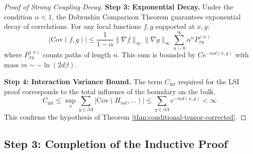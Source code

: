\begin{proof}[Proof of Strong Coupling Decay]
\textbf{Step 3: Exponential Decay.}
Under the condition $\alpha < 1$, the Dobrushin Comparison Theorem guarantees exponential decay of correlations. For any local functions $f, g$ supported at $x, y$:
\begin{equation}
|\mathrm{Cov}(f, g)| \le \frac{1}{1-\alpha} \|\nabla f\|_\infty \|\nabla g\|_\infty \sum_{n=0}^\infty \alpha^n P_{xy}^{(n)}
\end{equation}
where $P_{xy}^{(n)}$ counts paths of length $n$. This sum is bounded by $C e^{-m d(x,y)}$ with mass $m \sim -\ln(2d \beta)$.

\textbf{Step 4: Interaction Variance Bound.}
The term $C_{\mathrm{int}}$ required for the LSI proof corresponds to the total influence of the boundary on the bulk.
\begin{equation}
C_{\mathrm{int}} \le \sup_x \sum_{y \in \partial \Lambda} |\mathrm{Cov}(H_{int}, \dots)| \le \sum_{y \in \partial \Lambda} e^{-m d(x, y)} < \infty
\end{equation}
This confirms the hypothesis of Theorem \ref{thm:conditional-tensor-corrected}.
\end{proof}

\subsection{Step 3: Completion of the Inductive Proof}

